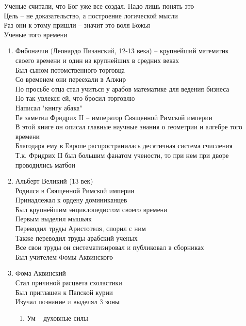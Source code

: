 \documentclass[12pt]{article}
\begin{document}
Ученые считали, что Бог уже все создал. Надо лишь понять это\\
Цель -- не доказательство, а построение логической мысли\\
Раз они к этому пришли -- значит это воля Божья\\
Ученые того времени
\begin{enumerate}
    \item Фибоначчи (Леонардо Пизанский, 12-13 века) -- крупнейший математик своего времени и один из крупнейших в средних веках\\
    Был сыном потомственного торговца\\
    Со временем они переехали в Алжир\\
    По просьбе отца стал учиться у арабов математике для ведения бизнеса\\
    Но так увлекся ей, что бросил торговлю\\
    Написал "книгу абака"\\
    Ее заметил Фридрих II -- император Священной Римской империи\\
    В этой книге он описал главные научные знания о геометрии и алгебре того времени\\
    Благодаря ему в Европе распространилась десятичная система счисления\\
    Т.к. Фридрих II был большим фанатом учености, то при нем при дворе проводились матбои
    \item Альберт Великий (13 век)\\
    Родился в Священной Римской империи\\
    Принадлежал к ордену доминиканцев\\
    Был крупнейшим энциклопедистом своего времени\\
    Первым выделил мышьяк\\
    Переводил труды Аристотеля, спорил с ним\\
    Также переводил труды арабский ученых\\
    Все свои труды он систематизировал и публиковал в сборниках\\
    Был учителем Фомы Аквинского
    \item Фома Аквинский\\
    Стал причиной расцвета схоластики\\
    Был приглашен к Папской курии\\
    Изучал познание и выделял 3 зоны
    \begin{enumerate}
        \item Ум -- духовные силы

\end{enumerate}
\end{enumerate}
\end{document}
